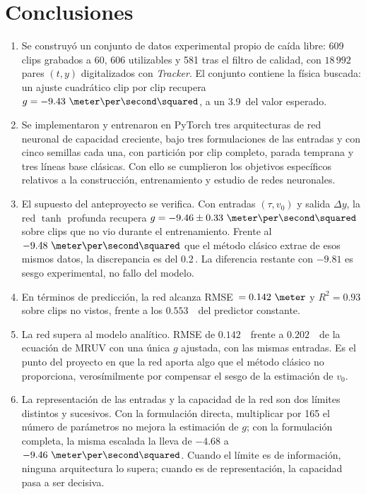 \documentclass[titlepage,11pt]{article}
\providecommand{\num}[1]{\ensuremath{#1}}
\providecommand{\SI}[2]{#1\,#2}
\providecommand{\percent}{\char37\relax}
\begin{document}
\section{Conclusiones}
\label{sec:conclusiones}

\begin{enumerate}
\item Se construyó un conjunto de datos experimental propio de caída libre: 609
  clips grabados a \unit{60}{\hertz}, 606 utilizables y 581 tras el filtro de
  calidad, con \num{18\,992} pares $(t,y)$ digitalizados con \emph{Tracker}. El
  conjunto contiene la física buscada: un ajuste cuadrático clip por clip
  recupera $g=\num{-9.43}~\meter\per\second\squared$, a un \SI{3.9}{\percent}
  del valor esperado.

\item Se implementaron y entrenaron en PyTorch tres arquitecturas de red
  neuronal de capacidad creciente, bajo tres formulaciones de las entradas y
  con cinco semillas cada una, con partición por clip completo, parada temprana
  y tres líneas base clásicas. Con ello se cumplieron los objetivos específicos
  relativos a la construcción, entrenamiento y estudio de redes neuronales.

\item El supuesto del anteproyecto se verifica. Con entradas
  $(\tau,v_0)$ y salida $\Delta y$, la red $\tanh$ profunda recupera
  $g=\num{-9.46}\pm\num{0.33}~\meter\per\second\squared$ sobre clips que no vio
  durante el entrenamiento. Frente al $\num{-9.48}~\meter\per\second\squared$
  que el método clásico extrae de esos mismos datos, la discrepancia es del
  \SI{0.2}{\percent}. La diferencia restante con $\num{-9.81}$ es sesgo
  experimental, no fallo del modelo.

\item En términos de predicción, la red alcanza RMSE~$=\num{0.142}~\meter$ y
  $R^2=\num{0.93}$ sobre clips no vistos, frente a los \num{0.553}~\meter\ del
  predictor constante.

\item La red supera al modelo analítico. RMSE de \num{0.142}~\meter\
  frente a \num{0.202}~\meter\ de la ecuación de MRUV con una única $g$
  ajustada, con las mismas entradas. Es el punto del proyecto en que la red
  aporta algo que el método clásico no proporciona, verosímilmente por
  compensar el sesgo de la estimación de $v_0$.

\item La representación de las entradas y la capacidad de la red son
  dos límites distintos y sucesivos. Con la formulación directa, multiplicar
  por 165 el número de parámetros no mejora la estimación de $g$; con la
  formulación completa, la misma escalada la lleva de $\num{-4.68}$ a
  $\num{-9.46}~\meter\per\second\squared$. Cuando el límite es de información,
  ninguna arquitectura lo supera; cuando es de representación, la capacidad
  pasa a ser decisiva.


\end{enumerate}
\end{document}
